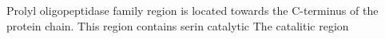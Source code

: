 Prolyl oligopeptidase family region is located towards the C-terminus of the protein chain. This region contains serin catalytic The catalitic region 